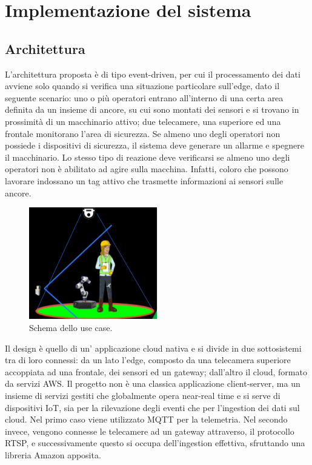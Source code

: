 \chapter{Implementazione del sistema}

\section{Architettura}
L’architettura proposta è di tipo event-driven, per cui il processamento dei dati avviene solo quando si verifica una situazione particolare sull’edge, dato il seguente scenario: uno o più operatori entrano all’interno di una certa area definita da un insieme di ancore, su cui sono montati dei sensori e si trovano in prossimità di un macchinario attivo; due telecamere, una superiore ed una frontale monitorano l’area di sicurezza. Se almeno uno degli operatori non possiede i dispositivi di sicurezza, il sistema deve generare un allarme e spegnere il macchinario. Lo stesso tipo di reazione deve verificarsi se almeno uno degli operatori non è abilitato ad agire sulla macchina. Infatti, coloro che possono lavorare indossano un tag attivo che trasmette informazioni ai sensori sulle ancore.

\begin{figure}[htbp]
    \centering
    \includegraphics[width=0.5\textwidth]{figures/use-case.png}
    \caption{Schema dello use case.} 
    \label{use-case}
\end{figure}


 Il design è quello di un’ applicazione cloud nativa e si divide in due sottosistemi tra di loro connessi: da un lato l'edge, composto da una telecamera superiore accoppiata ad una frontale, dei sensori ed un gateway; dall'altro il cloud, formato da servizi AWS. Il progetto non è una classica applicazione client-server, ma un insieme di servizi gestiti che globalmente opera near-real time e si serve di dispositivi IoT, sia per la rilevazione degli eventi che per l’ingestion dei dati sul cloud. Nel primo caso viene utilizzato MQTT per la telemetria. Nel secondo invece, vengono connesse le telecamere ad un gateway attraverso, il protocollo RTSP, e successivamente questo si occupa dell'ingestion effettiva, sfruttando una libreria Amazon apposita. 

